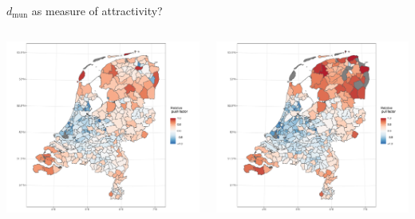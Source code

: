 \documentclass{beamer}
\begin{document}
\begin{frame}{$d_{\text{mun}}$ as measure of attractivity?}
		\begin{columns}
	\begin{column}{0.5\textwidth}
		\begin{center}
			\includegraphics[width=1.1\textwidth]{../../fig/p_coef_out}      
		\end{center}
	\end{column}
	\begin{column}{0.5\textwidth} 	
		\begin{center}
			\includegraphics[width=1.1\textwidth]{../../fig/p_coef_in}      
		\end{center}
	\end{column}
\end{columns}
\end{frame}
\end{document}
